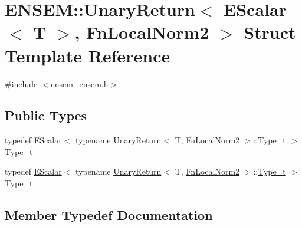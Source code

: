 \hypertarget{structENSEM_1_1UnaryReturn_3_01EScalar_3_01T_01_4_00_01FnLocalNorm2_01_4}{}\section{E\+N\+S\+EM\+:\+:Unary\+Return$<$ E\+Scalar$<$ T $>$, Fn\+Local\+Norm2 $>$ Struct Template Reference}
\label{structENSEM_1_1UnaryReturn_3_01EScalar_3_01T_01_4_00_01FnLocalNorm2_01_4}


{\ttfamily \#include $<$ensem\+\_\+ensem.\+h$>$}

\subsection*{Public Types}
\begin{DoxyCompactItemize}
\item 
typedef \mbox{\hyperlink{classENSEM_1_1EScalar}{E\+Scalar}}$<$ typename \mbox{\hyperlink{structENSEM_1_1UnaryReturn}{Unary\+Return}}$<$ T, \mbox{\hyperlink{structENSEM_1_1FnLocalNorm2}{Fn\+Local\+Norm2}} $>$\+::\mbox{\hyperlink{structENSEM_1_1UnaryReturn_3_01EScalar_3_01T_01_4_00_01FnLocalNorm2_01_4_ab80faba745e53e04277e860e474c3e19}{Type\+\_\+t}} $>$ \mbox{\hyperlink{structENSEM_1_1UnaryReturn_3_01EScalar_3_01T_01_4_00_01FnLocalNorm2_01_4_ab80faba745e53e04277e860e474c3e19}{Type\+\_\+t}}
\item 
typedef \mbox{\hyperlink{classENSEM_1_1EScalar}{E\+Scalar}}$<$ typename \mbox{\hyperlink{structENSEM_1_1UnaryReturn}{Unary\+Return}}$<$ T, \mbox{\hyperlink{structENSEM_1_1FnLocalNorm2}{Fn\+Local\+Norm2}} $>$\+::\mbox{\hyperlink{structENSEM_1_1UnaryReturn_3_01EScalar_3_01T_01_4_00_01FnLocalNorm2_01_4_ab80faba745e53e04277e860e474c3e19}{Type\+\_\+t}} $>$ \mbox{\hyperlink{structENSEM_1_1UnaryReturn_3_01EScalar_3_01T_01_4_00_01FnLocalNorm2_01_4_ab80faba745e53e04277e860e474c3e19}{Type\+\_\+t}}
\end{DoxyCompactItemize}


\subsection{Member Typedef Documentation}
\mbox{\label{structENSEM_1_1UnaryReturn_3_01EScalar_3_01T_01_4_00_01FnLocalNorm2_01_4_ab80faba745e53e04277e860e474c3e19}} 
